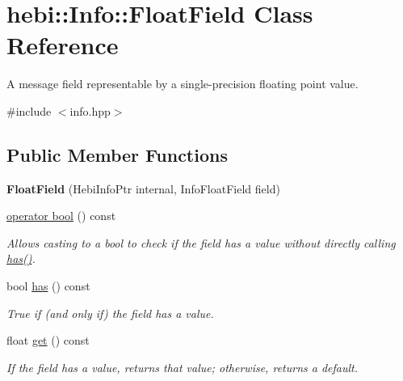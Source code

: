 \hypertarget{classhebi_1_1Info_1_1FloatField}{}\section{hebi\+:\+:Info\+:\+:Float\+Field Class Reference}
\label{classhebi_1_1Info_1_1FloatField}


A message field representable by a single-\/precision floating point value.  




{\ttfamily \#include $<$info.\+hpp$>$}

\subsection*{Public Member Functions}
\begin{DoxyCompactItemize}
\item 
{\bfseries Float\+Field} (Hebi\+Info\+Ptr internal, Info\+Float\+Field field)\hypertarget{classhebi_1_1Info_1_1FloatField_ae39eb285e1a2a021b429735d0f30cb4f}{}\label{classhebi_1_1Info_1_1FloatField_ae39eb285e1a2a021b429735d0f30cb4f}

\item 
\hyperlink{classhebi_1_1Info_1_1FloatField_a61f56a2e5a1ec192db8589fec95dbdf5}{operator bool} () const 
\begin{DoxyCompactList}\small\item\em Allows casting to a bool to check if the field has a value without directly calling {\ttfamily \hyperlink{classhebi_1_1Info_1_1FloatField_ab7b15a767a9191c1cf4655e8135c39e3}{has()}}. \end{DoxyCompactList}\item 
bool \hyperlink{classhebi_1_1Info_1_1FloatField_ab7b15a767a9191c1cf4655e8135c39e3}{has} () const \hypertarget{classhebi_1_1Info_1_1FloatField_ab7b15a767a9191c1cf4655e8135c39e3}{}\label{classhebi_1_1Info_1_1FloatField_ab7b15a767a9191c1cf4655e8135c39e3}

\begin{DoxyCompactList}\small\item\em True if (and only if) the field has a value. \end{DoxyCompactList}\item 
float \hyperlink{classhebi_1_1Info_1_1FloatField_acf67657223f5b3a8efc5a87972a6ffcd}{get} () const \hypertarget{classhebi_1_1Info_1_1FloatField_acf67657223f5b3a8efc5a87972a6ffcd}{}\label{classhebi_1_1Info_1_1FloatField_acf67657223f5b3a8efc5a87972a6ffcd}

\begin{DoxyCompactList}\small\item\em If the field has a value, returns that value; otherwise, returns a default. \end{DoxyCompactList}\end{DoxyCompactItemize}


